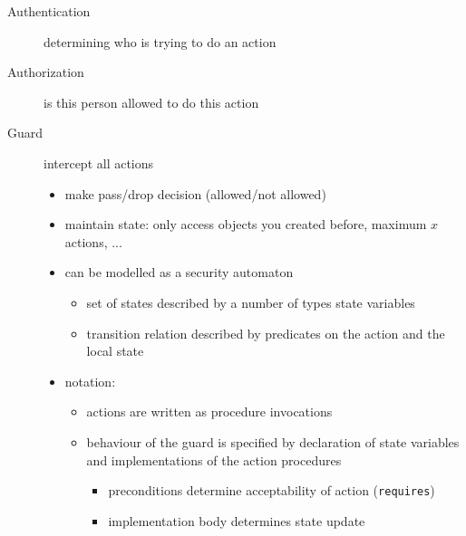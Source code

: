 \documentclass[12pt,titlepage,a4paper]{report}
\begin{document}
			\begin{description}
				\item[Authentication] determining who is trying to do an action
				\item[Authorization] is this person allowed to do this action
				\item[Guard] intercept all actions
				\begin{itemize}
					\item make pass/drop decision (allowed/not allowed)
					\item maintain state: only access objects you created before, maximum $x$ actions, ...
					\item can be modelled as a security automaton
					\begin{itemize}
						\item set of states described by a number of types state variables
						\item transition relation described by predicates on the action and the local state
					\end{itemize}
					\item notation:
					\begin{itemize}
						\item actions are written as procedure invocations
						\item behaviour of the guard is specified by declaration of state variables and implementations of the action procedures
						\begin{itemize}
							\item preconditions determine acceptability of action (\texttt{requires})
							\item implementation body determines state update
						\end{itemize}
					\end{itemize}
				\end{itemize}
			\end{description}
\end{document}
